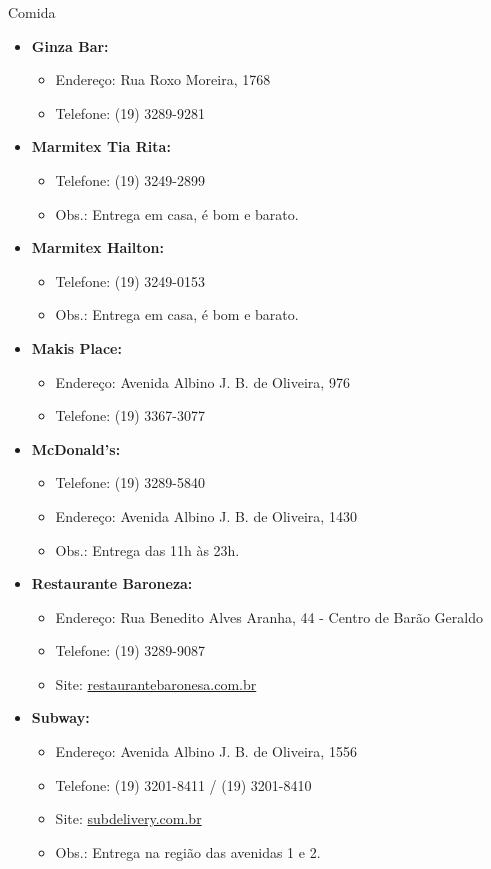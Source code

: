 \begin{story}{Comida}
\begin{itemize}
\item \textbf{Ginza Bar:}
\begin{itemize}
\item Endereço: Rua Roxo Moreira, 1768
\item Telefone: (19) 3289-9281
\end{itemize}

\item \textbf{Marmitex Tia Rita:}
\begin{itemize}
\item Telefone: (19) 3249-2899
\item Obs.: Entrega em casa, é bom e barato.
\end{itemize}

\item \textbf{Marmitex Hailton:}
\begin{itemize}
\item Telefone: (19) 3249-0153
\item Obs.: Entrega em casa, é bom e barato.
\end{itemize}

\item \textbf{Makis Place:}
\begin{itemize}
\item Endereço: Avenida Albino J. B. de Oliveira, 976
\item Telefone: (19) 3367-3077
\end{itemize}

\item \textbf{McDonald's:}
\begin{itemize}
\item Telefone: (19) 3289-5840
\item Endereço: Avenida Albino J. B. de Oliveira, 1430
\item Obs.: Entrega das 11h às 23h.
\end{itemize}

\item \textbf{Restaurante Baroneza:}
\begin{itemize}
\item Endereço: Rua Benedito Alves Aranha, 44 - Centro de Barão Geraldo
\item Telefone: (19) 3289-9087
\item Site: \url{restaurantebaronesa.com.br}
\end{itemize}

\item \textbf{Subway:}
\begin{itemize}
\item Endereço: Avenida Albino J. B. de Oliveira, 1556
\item Telefone: (19) 3201-8411 / (19) 3201-8410
\item Site: \url{subdelivery.com.br}
\item Obs.: Entrega na região das avenidas 1 e 2.
\end{itemize}


\end{itemize}
\end{story}

